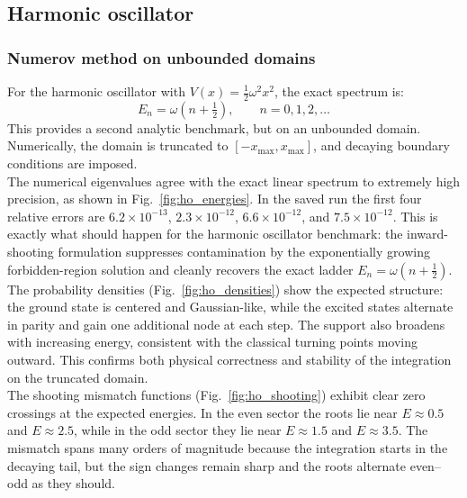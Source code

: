 \documentclass[11pt]{article}
\begin{document}
\begin{refsection}
        \subsection{Harmonic oscillator}
            \subsubsection{Numerov method on unbounded domains}
                For the harmonic oscillator with $V(x)=\tfrac{1}{2}\omega^2 x^2$, the exact spectrum is:
                \begin{equation}
                E_n = \omega\left(n+\tfrac{1}{2}\right), \qquad n=0,1,2,\ldots
                \end{equation}
                This provides a second analytic benchmark, but on an unbounded domain. Numerically, the domain is truncated to $[-x_{\max},x_{\max}]$, and decaying boundary conditions are imposed. \\

                The numerical eigenvalues agree with the exact linear spectrum to extremely high precision, as shown in Fig.~\ref{fig:ho_energies}. In the saved run the first four relative errors are $6.2\times10^{-13}$, $2.3\times10^{-12}$, $6.6\times10^{-12}$, and $7.5\times10^{-12}$. This is exactly what should happen for the harmonic oscillator benchmark: the inward-shooting formulation suppresses contamination by the exponentially growing forbidden-region solution and cleanly recovers the exact ladder $E_n=\omega(n+\tfrac12)$. \\

                The probability densities (Fig.~\ref{fig:ho_densities}) show the expected structure: the ground state is centered and Gaussian-like, while the excited states alternate in parity and gain one additional node at each step. The support also broadens with increasing energy, consistent with the classical turning points moving outward. This confirms both physical correctness and stability of the integration on the truncated domain. \\

                The shooting mismatch functions (Fig.~\ref{fig:ho_shooting}) exhibit clear zero crossings at the expected energies. In the even sector the roots lie near $E\approx0.5$ and $E\approx2.5$, while in the odd sector they lie near $E\approx1.5$ and $E\approx3.5$. The mismatch spans many orders of magnitude because the integration starts in the decaying tail, but the sign changes remain sharp and the roots alternate even--odd as they should. \\


\end{refsection}
\end{document}
